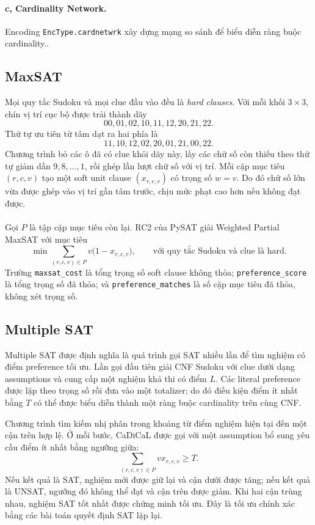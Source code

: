 \documentclass[a4paper,fleqn]{cas-sc}
\begin{document}
\paragraph{c, Cardinality Network.}
Encoding \texttt{EncType.cardnetwrk} xây dựng mạng so sánh để biểu diễn ràng buộc cardinality..

\subsection{MaxSAT}
Mọi quy tắc Sudoku và mọi clue đầu vào đều là \emph{hard clauses}. Với mỗi khối $3\times3$, chín vị trí cục bộ được trải thành dãy
\[
00,01,02,10,11,12,20,21,22.
\]
Thứ tự ưu tiên từ tâm dạt ra hai phía là
\[
11,10,12,02,20,01,21,00,22.
\]
Chương trình bỏ các ô đã có clue khỏi dãy này, lấy các chữ số còn thiếu theo thứ tự giảm dần $9,8,\ldots,1$, rồi ghép lần lượt chữ số với vị trí. Mỗi cặp mục tiêu $(r,c,v)$ tạo một soft unit clause $(x_{r,c,v})$ có trọng số $w=v$. Do đó chữ số lớn vừa được ghép vào vị trí gần tâm trước, chịu mức phạt cao hơn nếu không đạt được.
\\
\\
Gọi $P$ là tập cặp mục tiêu còn lại. RC2 của PySAT giải Weighted Partial MaxSAT với mục tiêu
\begin{equation}
 \min \sum_{(r,c,v)\in P} v\bigl(1-x_{r,c,v}\bigr),
 \qquad\text{với quy tắc Sudoku và clue là hard.}
 \label{eq:maxsat}
\end{equation}
Trường \texttt{maxsat\_cost} là tổng trọng số soft clause không thỏa; \texttt{preference\_score} là tổng trọng số đã thỏa; và \texttt{preference\_matches} là số cặp mục tiêu đã thỏa, không xét trọng số.

\subsection{Multiple SAT}
Multiple SAT được định nghĩa là quá trình gọi SAT nhiều lần để tìm nghiệm có điểm preference tối ưu. Lần gọi đầu tiên giải CNF Sudoku với clue dưới dạng assumptions và cung cấp một nghiệm khả thi có điểm $L$. Các literal preference được lặp theo trọng số rồi đưa vào một totalizer; do đó điều kiện điểm ít nhất bằng $T$ có thể được biểu diễn thành một ràng buộc cardinality trên cùng CNF.

Chương trình tìm kiếm nhị phân trong khoảng từ điểm nghiệm hiện tại đến một cận trên hợp lệ. Ở mỗi bước, CaDiCaL được gọi với một assumption bổ sung yêu cầu điểm ít nhất bằng ngưỡng giữa:
\begin{equation}
 \sum_{(r,c,v)\in P} v x_{r,c,v}\ge T.
 \label{eq:multiple-bound}
\end{equation}
Nếu kết quả là SAT, nghiệm mới được giữ lại và cận dưới được tăng; nếu kết quả là UNSAT, ngưỡng đó không thể đạt và cận trên được giảm. Khi hai cận trùng nhau, nghiệm SAT tốt nhất được chứng minh tối ưu. Đây là tối ưu chính xác bằng các bài toán quyết định SAT lặp lại.
\end{document}
